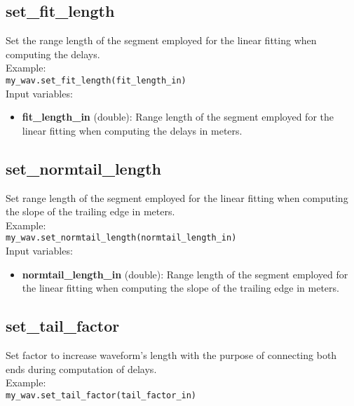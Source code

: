 \subsection{set\_fit\_length}

Set the range length of the segment employed for the linear fitting when computing the delays.\\

Example:\\

\texttt{my\_wav.set\_fit\_length(fit\_length\_in)}\\

Input variables:
\begin{itemize}
\item {\bf fit\_length\_in} (double): Range length of the segment employed for the linear fitting when computing the delays in meters.
\end{itemize}


\subsection{set\_normtail\_length}

Set range length of the segment employed for the linear fitting when computing the slope of the trailing edge in meters.\\

Example:\\

\texttt{my\_wav.set\_normtail\_length(normtail\_length\_in)}\\

Input variables:
\begin{itemize}
\item {\bf normtail\_length\_in} (double): Range length of the segment employed for the linear fitting when computing the slope of the trailing edge in meters.
\end{itemize}


\subsection{set\_tail\_factor}

Set factor to increase waveform's length with the purpose of connecting both ends during computation of delays.\\

Example:\\

\texttt{my\_wav.set\_tail\_factor(tail\_factor\_in)}\\

